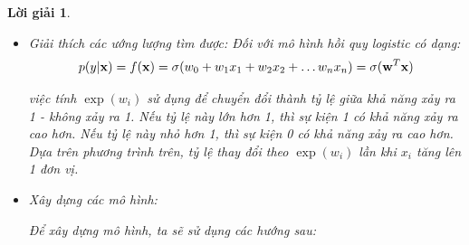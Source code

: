 \documentclass[14pt, a4paper]{article}
\theoremstyle{sltheorem}
\theoremstyle{soltheorem}
\newtheorem*{loigiai}{Lời giải}
\begin{document}
\begin{loigiai}
\begin{itemize}
        \begin{itemize}
            \item Mô hình logistic yêu cầu biến phụ thuộc có dạng nhị phân hoặc biến phụ thuộc là dạng định danh.
            \item Mô hình logistic yêu cầu các quan sát phải độc lập với nhau. Nghĩa là mỗi ví dụ học không phụ thuộc vào bất kỳ ví dụ học nào khác trong tập dữ liệu.
            Nhưng giả định này thường hay bị vi phạm do có nhiều điểm dữ liệu được đo trong một khoảng thời gian, không gian gần nhau dẫn đến các quan sát có sự liên quan nhất định với nhau.
            \item Mô hình logistic đòi hỏi phải có ít hoặc không có đa cộng tuyến giữa các biến độc lập.
            Điều này có nghĩa là các biến độc lập không nên có tương quan quá cao với nhau.
            \item Không có các điểm ngoại lai: hồi quy logistic rất nhạy cảm với các giá trị ngoại lai hoặc các điểm dữ liệu có giá trị lớn hoặc nhỏ bất thường.
            \item Mô hình logistic giả định mối quan hệ của hàm log cơ số tự nhiên của tỷ số xác suất xảy ra - không xảy ra phụ thuộc tuyến tính vào các biến độc lập.
            \item Mô hình logistic cần một số lượng các ví dụ học đủ lớn. Số ví dụ học cần ít nhất là khoảng 10 lần số biến độc lập được đưa vào mô hình.
        \end{itemize}

        \item Giải thích các ướng lượng tìm được:
        Đối với mô hình hồi quy logistic có dạng:
        \begin{equation*}
            p(y \vert \bold{x}) = f(\bold{x}) = \sigma(w_0 + w_1 x_1 + w_2 x_2 + \dots w_n x_n) = \sigma(\bold{w}^T \bold{x})
        \end{equation*}

        việc tính $\exp(w_i)$ sử dụng để chuyển đổi thành tỷ lệ giữa khả năng xảy ra 1 - không xảy ra 1.
        Nếu tỷ lệ này lớn hơn 1, thì sự kiện 1 có khả năng xảy ra cao hơn.
        Nếu tỷ lệ này nhỏ hơn 1, thì sự kiện 0 có khả năng xảy ra cao hơn.
        Dựa trên phương trình trên, tỷ lệ thay đổi theo $\exp(w_i)$ lần khi $x_i$ tăng lên 1 đơn vị.

        \item Xây dựng các mô hình:
        
        Để xây dựng mô hình, ta sẽ sử dụng các hướng sau:


\end{itemize}
\end{loigiai}
\end{document}
